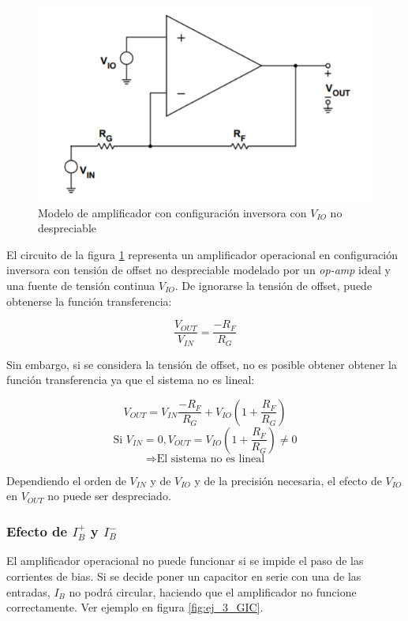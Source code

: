\documentclass[../../main.tex]{subfiles}
\begin{document}
\begin{figure}[htb]	%
	\centering
	\includegraphics[height=0.2\textheight]{imagenes/vio_amplificacion.png}
	\caption{Modelo de amplificador con configuraci\'on inversora con $V_{IO}$ no despreciable}
	\label{fig:ej_3_efecto_vio}
\end{figure}

El circuito de la figura \ref{fig:ej_3_efecto_vio} representa un amplificador operacional en configuraci\'on inversora con tensi\'on de offset no despreciable modelado por un \textit{op-amp} ideal y una fuente de tensi\'on continua $V_{IO}$. De ignorarse la tensi\'on de offset, puede obtenerse la funci\'on transferencia:

\[\frac{V_{OUT}}{V_{IN}}=\frac{-R_F}{R_G}\]

Sin embargo, si se considera la tensi\'on de offset, no es posible obtener obtener la funci\'on transferencia ya que el sistema no es lineal:

\[V_{OUT}=V_{IN}\frac{-R_F}{R_G} + V_{IO}\left(1+\frac{R_F}{R_G}\right)\]
\[\text{Si }V_{IN} = 0,V_{OUT} = V_{IO}\left(1+\frac{R_F}{R_G}\right) \neq 0 \]
\[\Rightarrow \text{El sistema no es lineal}\]

Dependiendo el orden de $V_{IN}$ y de $V_{IO}$ y de la precisi\'on necesaria, el efecto de $V_{IO}$ en $V_{OUT}$ no puede ser despreciado.

\subsubsection*{Efecto de $I_B^+$ y $I_B^-$}
El amplificador operacional no puede funcionar si se impide el paso de las corrientes de bias. Si se decide poner un capacitor en serie con una de las entradas, $I_B$ no podr\'a circular, haciendo que el amplificador no funcione correctamente. Ver ejemplo en figura \ref{fig:ej_3_GIC}. 
\end{document}
